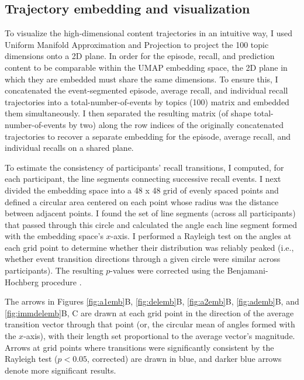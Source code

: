 \documentclass{article}
\begin{document}
\subsection*{Trajectory embedding and visualization}\label{sec:embedding}
To visualize the high-dimensional content trajectories in an intuitive way, I used Uniform Manifold Approximation and Projection \citep[UMAP;][]{McInHeal18} to project the 100 topic dimensions onto a 2D plane.  In order for the episode, recall, and prediction content to be comparable within the UMAP embedding space, the 2D plane in which they are embedded must share the same dimensions.  To ensure this, I concatenated the event-segmented episode, average recall, and individual recall trajectories into a total-number-of-events by topics (100) matrix and embedded them simultaneously.  I then separated the resulting matrix (of shape total-number-of-events by two) along the row indices of the originally concatenated trajectories to recover a separate embedding for the episode, average recall, and individual recalls on a shared plane.

To estimate the consistency of participants' recall transitions, I computed, for each participant, the line segments connecting successive recall events.  I next divided the embedding space into a 48 x 48 grid of evenly spaced points and defined a circular area centered on each point whose radius was the distance between adjacent points.  I found the set of line segments (across all participants) that passed through this circle and calculated the angle each line segment formed with the embedding space's $x$-axis. I performed a Rayleigh test on the angles at each grid point to determine whether their distribution was reliably peaked (i.e., whether event transition directions through a given circle were similar across participants).  The resulting $p$-values were corrected using the Benjamani-Hochberg procedure \citep{BenjHoch95}.

The arrows in Figures \ref{fig:a1emb}B, \ref{fig:delemb}B, \ref{fig:a2emb}B, \ref{fig:ademb}B, and \ref{fig:immdelemb}B, C are drawn at each grid point in the direction of the average transition vector through that point (or, the circular mean of angles formed with the $x$-axis), with their length set proportional to the average vector's magnitude.  Arrows at grid points where transitions were significantly consistent by the Rayleigh test ($p<0.05$, corrected) are drawn in blue, and darker blue arrows denote more significant results.
\end{document}
